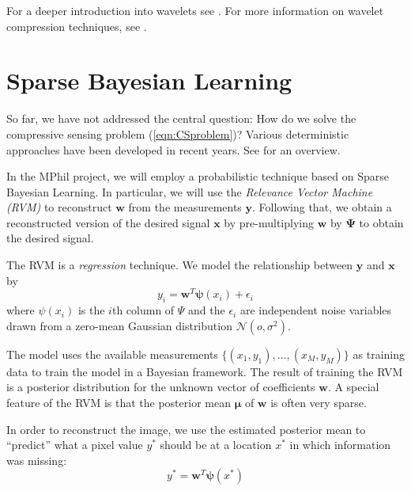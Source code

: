 \documentclass[final,3p]{report}
\let\bs\boldsymbol
\begin{document}
For a deeper introduction into wavelets see \cite{stollnitz1995}.
For more information on wavelet compression techniques, see \cite{devore1992}.

\section{Sparse Bayesian Learning}
So far, we have not addressed the central question: How do we solve the compressive sensing problem (\ref{eqn:CSproblem})?
Various deterministic approaches have been developed in recent years.
See \cite{pilikos2014} for an overview.

In the MPhil project, we will employ a probabilistic technique based on Sparse Bayesian Learning.
In particular, we will use the \emph{Relevance Vector Machine (RVM)} \cite{tipping2001,tipping2003} to reconstruct $\bs w$ from the measurements $\bs y$.
Following that, we obtain a reconstructed version of the desired signal $\bs x$ by pre-multiplying $\bs w$ by $\bs \Psi$ to obtain the desired signal.

The RVM is a \emph{regression} technique.
We model the relationship between $\bs y$ and $\bs x$ by
\begin{equation}
\label{eqn:rvmmodel}
y_i = \bs w^T \bs \psi(x_i) + \epsilon_i
\end{equation}
where $\psi(x_i)$ is the $i$th column of $\Psi$ and the $\epsilon_i$ are independent noise variables drawn from a zero-mean Gaussian distribution $\mathcal{N}(o,\sigma^2)$.

The model uses the available measurements $\{(x_1,y_1),\dots,(x_M,y_M)\}$ as training data to train the model in a Bayesian framework.
The result of training the RVM is a posterior distribution for the unknown vector of coefficients $\bs w$.
A special feature of the RVM is that the posterior mean $\bs \mu$ of $\bs w$ is often very sparse.

In order to reconstruct the image, we use the estimated posterior mean to ``predict'' what a pixel value $y^*$ should be at a location $x^*$ in which information was missing:
\begin{equation}
y^* = \bs w^T\bs\psi(x^*)
\end{equation}
\end{document}
